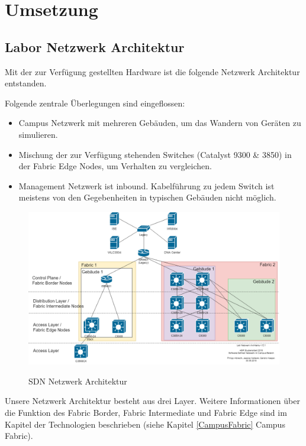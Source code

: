 \section{Umsetzung}

\subsection{Labor Netzwerk Architektur} \label{Labor-Netzwerk-Architektur}
Mit der zur Verfügung gestellten Hardware ist die folgende Netzwerk Architektur entstanden.

Folgende zentrale Überlegungen sind eingeflossen:

\begin{itemize}
	\item Campus Netzwerk mit mehreren Gebäuden, um das Wandern von Geräten zu simulieren.
	\item Mischung der zur Verfügung stehenden Switches (Catalyst 9300 \& 3850) in der Fabric Edge Nodes, um Verhalten zu vergleichen.
	\item Management Netzwerk ist inbound. Kabelführung zu jedem Switch ist meistens von den Gegebenheiten in typischen Gebäuden nicht möglich.
\end{itemize}


\begin{figure}[H]
	\centering
	\includegraphics[width=1\linewidth]{img/LabNetworkArchitecture.png}\\[1px]
	\caption{SDN Netzwerk Architektur}
	\label{fig:LabNetworkArchitecture}
\end{figure}

Unsere Netzwerk Architektur besteht aus drei Layer. Weitere Informationen über die Funktion des Fabric Border, Fabric Intermediate und Fabric Edge sind im Kapitel der Technologien beschrieben (siehe Kapitel \ref{CampusFabric} Campus Fabric).

